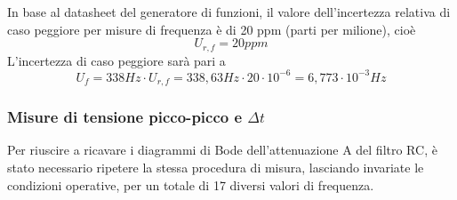 In base al datasheet del generatore di funzioni, il valore dell'incertezza relativa di caso peggiore per misure di frequenza è di 20 ppm (parti per milione), cioè 
\[U_{r,f} = 20 ppm\]
L'incertezza di caso peggiore sarà pari a
\[U_f = 338 Hz\cdot U_{r,f} = 338,63Hz \cdot 20 \cdot 10^{-6} = 6,773\cdot10^{-3}Hz\]


\clearpage
\subsubsection{Misure di tensione picco-picco e $\Delta t$}

Per riuscire a ricavare i diagrammi di Bode dell'attenuazione A del filtro RC, è stato necessario ripetere la stessa procedura di misura, lasciando invariate le condizioni operative, per un totale di 17 diversi valori di frequenza.

